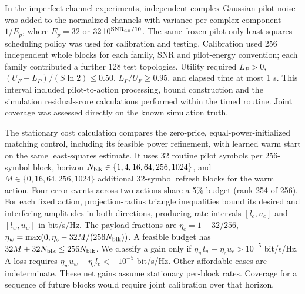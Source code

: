 \documentclass[lineno,pdflatex,sn-nature]{sn-jnl}
\begin{document}
In the imperfect-channel experiments, independent complex Gaussian pilot noise was added to the normalized channels with variance per complex component \(1/E_p\), where \(E_p=32\) or \(32\,10^{\mathrm{SNR}_{\rm dB}/10}\). The same frozen pilot-only least-squares scheduling policy was used for calibration and testing. Calibration used 256 independent whole blocks for each family, SNR and pilot-energy convention; each family contributed a further 128 test topologies. Utility required \(L_P>0\), \((U_F-L_P)/(S\ln2)\leq0.50\), \(L_P/U_F\geq0.95\), and elapsed time at most 1 s. This interval included pilot-to-action processing, bound construction and the simulation residual-score calculations performed within the timed routine. Joint coverage was assessed directly on the known simulation truth.

The stationary cost calculation compares the zero-price, equal-power-initialized matching control, including its feasible power refinement, with learned warm start on the same least-squares estimate. It uses 32 routine pilot symbols per 256-symbol block, horizon \(N_{\rm blk}\in\{1,4,16,64,256,1024\}\), and \(M\in\{0,16,64,256,1024\}\) additional 32-symbol refresh blocks for the warm action. Four error events across two actions share a 5\% budget (rank 254 of 256). For each fixed action, projection-radius triangle inequalities bound its desired and interfering amplitudes in both directions, producing rate intervals \([l_c,u_c]\) and \([l_w,u_w]\) in bit/s/Hz. The payload fractions are \(\eta_c=1-32/256\), \(\eta_w=\max(0,\eta_c-32M/(256N_{\rm blk}))\). A feasible budget has \(32M+32N_{\rm blk}\leq256N_{\rm blk}\). We classify a gain only if \(\eta_w l_w-\eta_c u_c>10^{-5}\) bit/s/Hz. A loss requires \(\eta_wu_w-\eta_cl_c<-10^{-5}\) bit/s/Hz. Other affordable cases are indeterminate. These net gains assume stationary per-block rates. Coverage for a sequence of future blocks would require joint calibration over that horizon.
\end{document}
